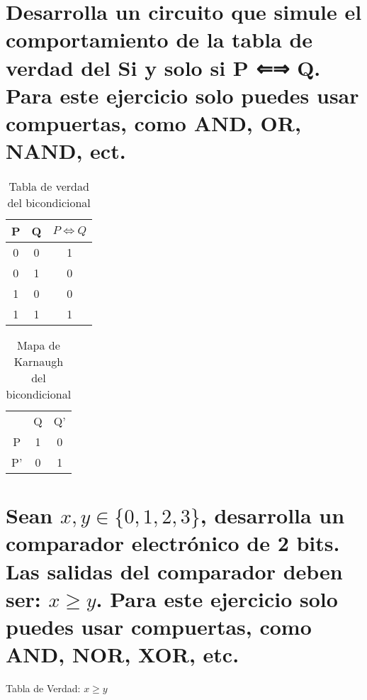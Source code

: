 \documentclass{article}
\begin{document}



\section*{Desarrolla un circuito que simule el comportamiento de la tabla de verdad del Si y solo si P ⇐⇒ Q. Para este ejercicio solo puedes usar compuertas, como AND, OR, NAND, ect.}


\begin{table}[h]
\centering
\begin{tabular}{cc|c}
\hline
P & Q & \( P \Leftrightarrow Q \) \\
\hline
0 & 0 & 1 \\
0 & 1 & 0 \\
1 & 0 & 0 \\
1 & 1 & 1 \\
\hline
\end{tabular}
\caption{Tabla de verdad del bicondicional}
\label{tab:truth_table_biconditional}
\end{table}

\begin{table}[h]
\centering
\begin{tabular}{c|c|c}
\multicolumn{1}{r}{} & \multicolumn{1}{c}{Q} & \multicolumn{1}{c}{Q'} \\ \cline{2-3}
P  & 1 & 0 \\ \cline{2-3}
P' & 0 & 1 \\ \cline{2-3}
\end{tabular}
\caption{Mapa de Karnaugh del bicondicional}
\label{tab:kmap_biconditional}
\end{table}

 \section{Sean \(x, y \in \{0, 1, 2, 3\}\), desarrolla un comparador electrónico de 2 bits. Las salidas del comparador deben ser: \(x \geq y\). Para este ejercicio solo puedes usar compuertas, como AND, NOR, XOR, etc.}
    
    \centering
    \caption{Tabla de Verdad: $x\geq y$}
    
\end{document}
